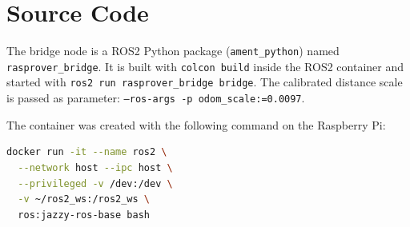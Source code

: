 \chapter{Source Code}
\label{app:code}

The bridge node is a ROS2 Python package (\texttt{ament\_python}) named \texttt{rasprover\_bridge}. It is built with \texttt{colcon build} inside the ROS2 container and started with \texttt{ros2 run rasprover\_bridge bridge}. The calibrated distance scale is passed as parameter: \texttt{--ros-args -p odom\_scale:=0.0097}.

The container was created with the following command on the Raspberry Pi:

\begin{lstlisting}[language=bash, numbers=none, caption={Creation of the ROS2 container.}, label={lst:docker}]
docker run -it --name ros2 \
  --network host --ipc host \
  --privileged -v /dev:/dev \
  -v ~/ros2_ws:/ros2_ws \
  ros:jazzy-ros-base bash
\end{lstlisting}








